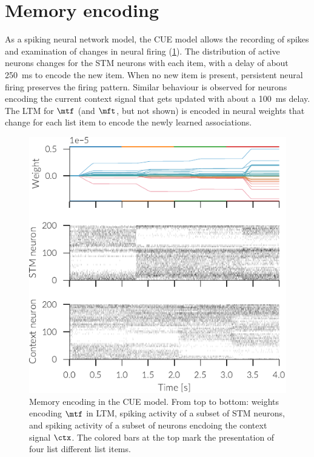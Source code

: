 \section{Memory encoding}
As a spiking neural network model, the CUE model allows the recording of spikes and examination of changes in neural firing (\cref{fig:spikes}).
The distribution of active neurons changes for the STM neurons with each item, with a delay of about \SI{250}{\milli\second} to encode the new item.
When no new item is present, persistent neural firing preserves the firing pattern.
Similar behaviour is observed for neurons encoding the current context signal that gets updated with about a \SI{100}{\milli\second} delay.
The LTM for $\mtf$ (and $\mft$, but not shown) is encoded in neural weights that change for each list item to encode the newly learned associations.
\begin{figure}
    \centering
    \includegraphics{figures/spikes}
    \caption[Memory encoding in the CUE model.]{Memory encoding in the CUE model. From top to bottom: weights encoding $\mtf$ in LTM, spiking activity of a subset of STM neurons, and spiking activity of a subset of neurons encdoing the context signal $\ctx$. The colored bars at the top mark the presentation of four list different list items.}\label{fig:spikes}
\end{figure}
